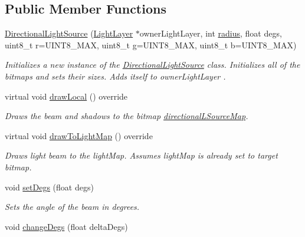 \subsection*{Public Member Functions}
\begin{DoxyCompactItemize}
\item 
\hyperlink{classlighting_1_1DirectionalLightSource_a65a9f9b9c9e624c4d9a2936dc86fa0b8}{Directional\+Light\+Source} (\hyperlink{classlighting_1_1LightLayer}{Light\+Layer} $\ast$owner\+Light\+Layer, int \hyperlink{classlighting_1_1CircleLightSource_a4da9b32f524563c2faeba5ea81dfe6fb}{radius}, float degs, uint8\+\_\+t r=U\+I\+N\+T8\+\_\+\+M\+AX, uint8\+\_\+t g=U\+I\+N\+T8\+\_\+\+M\+AX, uint8\+\_\+t b=U\+I\+N\+T8\+\_\+\+M\+AX)
\begin{DoxyCompactList}\small\item\em Initializes a new instance of the \hyperlink{classlighting_1_1DirectionalLightSource}{Directional\+Light\+Source} class. Initializes all of the bitmaps and sets their sizes. Adds itself to {\itshape owner\+Light\+Layer} . \end{DoxyCompactList}\item 
virtual void \hyperlink{classlighting_1_1DirectionalLightSource_a52f9f09a4088a44bf3f8b08df435a7aa}{draw\+Local} () override
\begin{DoxyCompactList}\small\item\em Draws the beam and shadows to the bitmap \hyperlink{classlighting_1_1DirectionalLightSource_afc3f2e73813a6d9c035aa0d58ad5d37c}{directional\+L\+Source\+Map}. \end{DoxyCompactList}\item 
virtual void \hyperlink{classlighting_1_1DirectionalLightSource_ab41be6321df178f861cd71462ab47553}{draw\+To\+Light\+Map} () override
\begin{DoxyCompactList}\small\item\em Draws light beam to the light\+Map. Assumes light\+Map is already set to target bitmap. \end{DoxyCompactList}\item 
void \hyperlink{classlighting_1_1DirectionalLightSource_a744ef9d945ccd0ea2dcfe94582c0515b}{set\+Degs} (float degs)
\begin{DoxyCompactList}\small\item\em Sets the angle of the beam in degrees. \end{DoxyCompactList}\item 
void \hyperlink{classlighting_1_1DirectionalLightSource_ada5610905c7449a464eb89496b026b55}{change\+Degs} (float delta\+Degs)

\end{DoxyCompactItemize}
